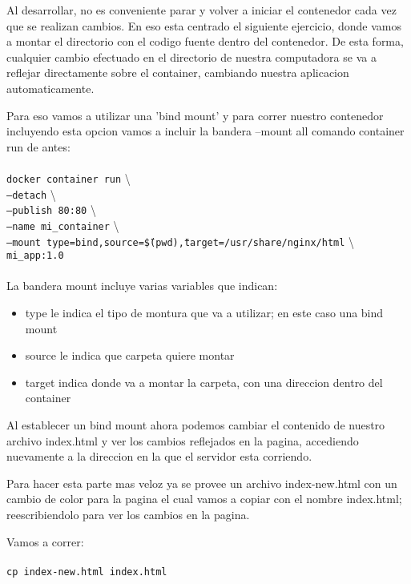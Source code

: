 \documentclass[11pt]{article} %
\begin{document}
Al desarrollar, no es conveniente parar y volver a iniciar el contenedor cada vez que se realizan cambios. En eso esta centrado el siguiente ejercicio, donde vamos a montar el directorio con el codigo fuente dentro del contenedor. De esta forma, cualquier cambio efectuado en el directorio de nuestra computadora se va a reflejar directamente sobre el container, cambiando nuestra aplicacion automaticamente.

Para eso vamos a utilizar una 'bind mount' y para correr nuestro contenedor incluyendo esta opcion vamos a incluir la bandera --mount all comando container run de antes: \\ \\
	\texttt{docker container run} \textbackslash \\
	\texttt{--detach} \textbackslash \\
	\texttt{--publish 80:80} \textbackslash \\
	\texttt{--name mi\_container} \textbackslash \\
	\texttt{--mount type=bind,source=\"\$(pwd)\",target=/usr/share/nginx/html} \textbackslash \\
	\texttt{mi\_app:1.0} \\ \\

La bandera mount incluye varias variables que indican:
\begin{itemize}
	
	\item
	type le indica el tipo de montura que va a utilizar; en este caso una bind mount

	\item	
	source le indica que carpeta quiere montar
	
	\item	
	target indica donde va a montar la carpeta, con una direccion dentro del container
\end{itemize}

Al establecer un bind mount ahora podemos cambiar el contenido de nuestro archivo index.html y ver los cambios reflejados en la pagina, accediendo nuevamente a la direccion en la que el servidor esta corriendo.

Para hacer esta parte mas veloz ya se provee un archivo index-new.html con un cambio de color para la pagina el cual vamos a copiar con el nombre index.html; reescribiendolo para ver los cambios en la pagina.

Vamos a correr: \\ \\
	\texttt{cp index-new.html index.html} \\
\end{document}
